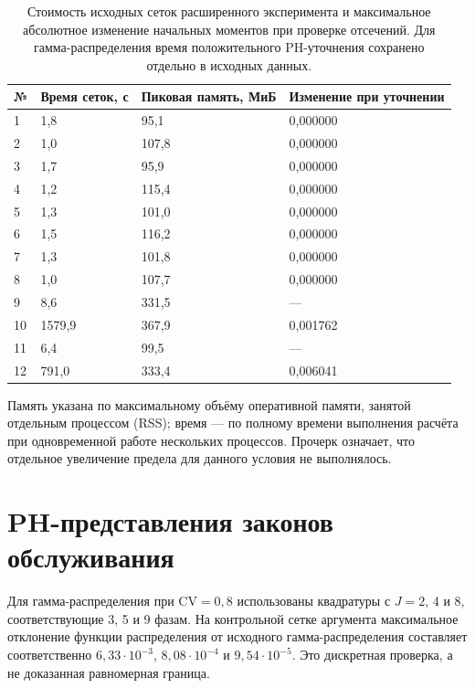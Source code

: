 \documentclass[a4paper,12pt]{article}
\begin{document}
\begin{table}[!htbp]
\centering\small\setlength{\tabcolsep}{2pt}
\begin{tabular}{@{}p{0.94cm}p{4.25cm}p{4.72cm}p{5.67cm}@{}}
\toprule
№ & Время сеток, с & Пиковая память, МиБ & Изменение при уточнении \\
\midrule
1 & 1,8 & 95,1 & 0,000000 \\
2 & 1,0 & 107,8 & 0,000000 \\
3 & 1,7 & 95,9 & 0,000000 \\
4 & 1,2 & 115,4 & 0,000000 \\
5 & 1,3 & 101,0 & 0,000000 \\
6 & 1,5 & 116,2 & 0,000000 \\
7 & 1,3 & 101,8 & 0,000000 \\
8 & 1,0 & 107,7 & 0,000000 \\
9 & 8,6 & 331,5 & — \\
10 & 1579,9 & 367,9 & 0,001762 \\
11 & 6,4 & 99,5 & — \\
12 & 791,0 & 333,4 & 0,006041 \\
\bottomrule
\end{tabular}
\caption{Стоимость исходных сеток расширенного эксперимента и максимальное абсолютное изменение начальных моментов при проверке отсечений. Для гамма-распределения время положительного PH-уточнения сохранено отдельно в исходных данных.}
\label{tab:cost}
\end{table}

Память указана по максимальному объёму оперативной памяти, занятой отдельным процессом (RSS); время --- по полному времени выполнения расчёта при одновременной работе нескольких процессов. Прочерк означает, что отдельное увеличение предела для данного условия не выполнялось.

\section{PH-представления законов обслуживания}
Для гамма-распределения при \(\mathrm{CV}=0{,}8\) использованы квадратуры с \(J=2\), 4 и 8, соответствующие 3, 5 и 9 фазам. На контрольной сетке аргумента максимальное отклонение функции распределения от исходного гамма-распределения составляет соответственно \(6{,}33\cdot10^{-3}\), \(8{,}08\cdot10^{-4}\) и \(9{,}54\cdot10^{-5}\). Это дискретная проверка, а не доказанная равномерная граница.
\end{document}
